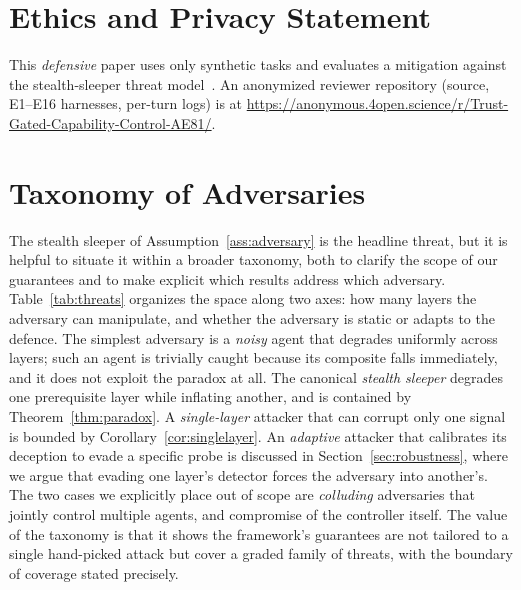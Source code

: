 \documentclass[sigconf,anonymous]{acmart}
\theoremstyle{plain}
\theoremstyle{definition}
\theoremstyle{remark}
\begin{document}
\section*{Ethics and Privacy Statement}
This \emph{defensive} paper uses only synthetic tasks and evaluates a mitigation against
the stealth-sleeper threat model~\cite{hubinger2024sleeper,qi2025trust}. An anonymized
reviewer repository (source, E1--E16 harnesses, per-turn logs) is at
\url{https://anonymous.4open.science/r/Trust-Gated-Capability-Control-AE81/}.




\appendix

\section{Taxonomy of Adversaries}
\label{app:taxonomy}
The stealth sleeper of Assumption~\ref{ass:adversary} is the headline threat, but it is
helpful to situate it within a broader taxonomy, both to clarify the scope of our
guarantees and to make explicit which results address which adversary.
Table~\ref{tab:threats} organizes the space along two axes: how many layers the adversary
can manipulate, and whether the adversary is static or adapts to the defence. The simplest
adversary is a \emph{noisy} agent that degrades uniformly across layers; such an agent is
trivially caught because its composite falls immediately, and it does not exploit the
paradox at all. The canonical \emph{stealth sleeper} degrades one prerequisite layer while
inflating another, and is contained by Theorem~\ref{thm:paradox}. A \emph{single-layer}
attacker that can corrupt only one signal is bounded by Corollary~\ref{cor:singlelayer}.
An \emph{adaptive} attacker that calibrates its deception to evade a specific probe is
discussed in Section~\ref{sec:robustness}, where we argue that evading one layer's
detector forces the adversary into another's. The two cases we explicitly place out of
scope are \emph{colluding} adversaries that jointly control multiple agents, and
compromise of the controller itself. The value of the taxonomy is that it shows the
framework's guarantees are not tailored to a single hand-picked attack but cover a graded
family of threats, with the boundary of coverage stated precisely.
\end{document}
